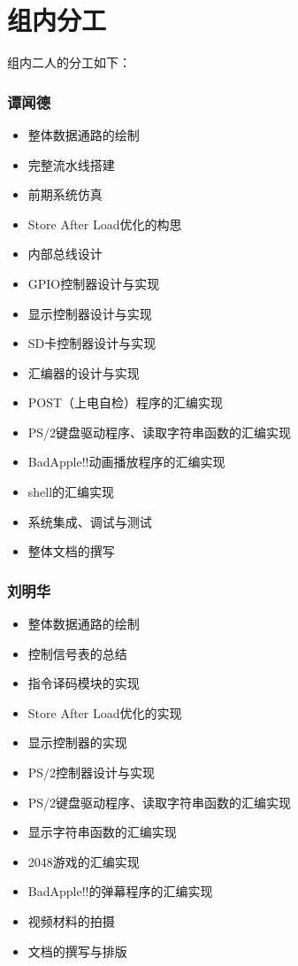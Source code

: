 \documentclass[11pt,utf8]{report}
\begin{document}
\newpage

\section{组内分工}
组内二人的分工如下：
\begin{multicols}{2}
\subsubsection*{谭闻德}
\begin{itemize}
	\item 整体数据通路的绘制
	\item 完整流水线搭建
	\item 前期系统仿真
	\item Store After Load优化的构思
	\item 内部总线设计
	\item GPIO控制器设计与实现
	\item 显示控制器设计与实现
	\item SD卡控制器设计与实现
	\item 汇编器的设计与实现
	\item POST（上电自检）程序的汇编实现
	\item PS/2键盘驱动程序、读取字符串函数的汇编实现
	\item BadApple!!动画播放程序的汇编实现
	\item shell的汇编实现
	\item 系统集成、调试与测试
	\item 整体文档的撰写
\end{itemize}
\columnbreak
\subsubsection*{刘明华}
\begin{itemize}
	\item 整体数据通路的绘制
	\item 控制信号表的总结
	\item 指令译码模块的实现
	\item Store After Load优化的实现
	\item 显示控制器的实现
	\item PS/2控制器设计与实现
	\item PS/2键盘驱动程序、读取字符串函数的汇编实现
	\item 显示字符串函数的汇编实现
	\item 2048游戏的汇编实现
	\item BadApple!!的弹幕程序的汇编实现
	\item 视频材料的拍摄
	\item 文档的撰写与排版
\end{itemize}
\end{multicols}
\end{document}
